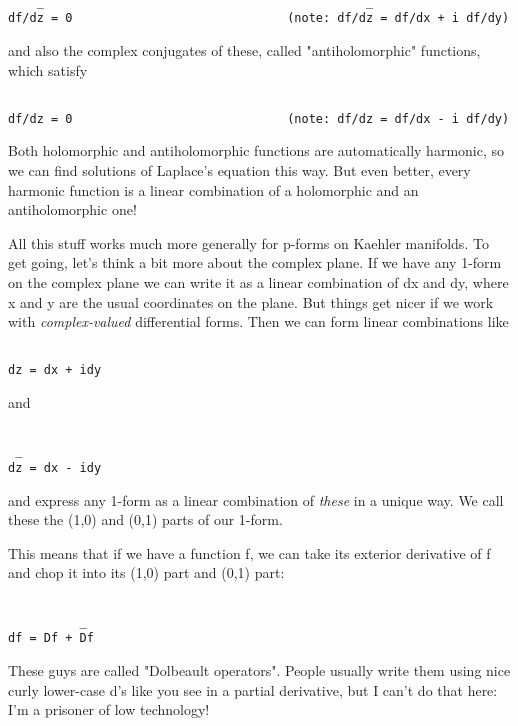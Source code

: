 \begin{verbatim}

    _                                             _ 
df/dz = 0                              (note: df/dz = df/dx + i df/dy)
\end{verbatim}
    
and also the complex conjugates of these, called "antiholomorphic"
functions, which satisfy


\begin{verbatim}

df/dz = 0                              (note: df/dz = df/dx - i df/dy)
\end{verbatim}
    
Both holomorphic and antiholomorphic functions are automatically harmonic, 
so we can find solutions of Laplace's equation this way.  But even better, 
every harmonic function is a linear combination of a holomorphic and an 
antiholomorphic one!  

All this stuff works much more generally for p-forms on Kaehler
manifolds.  To get going, let's think a bit more about the complex
plane.  If we have any 1-form on the complex plane we can write it as a
linear combination of dx and dy, where x and y are the usual coordinates
on the plane.  But things get nicer if we work with \emph{complex-valued}
differential forms.  Then we can form linear combinations like


\begin{verbatim}

dz = dx + idy
\end{verbatim}
    
and 

\begin{verbatim}

 _
dz = dx - idy
\end{verbatim}
    
and express any 1-form as a linear combination of \emph{these} 
in a unique way.
We call these the (1,0) and (0,1) parts of our 1-form.  

This means that if we have a function f, we can take its exterior
derivative of f and chop it into its (1,0) part and (0,1) part: 

\begin{verbatim}

          _ 
df = Df + Df
\end{verbatim}
    
These guys are called "Dolbeault operators".  People usually
write them using nice curly lower-case d's like you see in a partial
derivative, but I can't do that here: I'm a prisoner of low technology!

